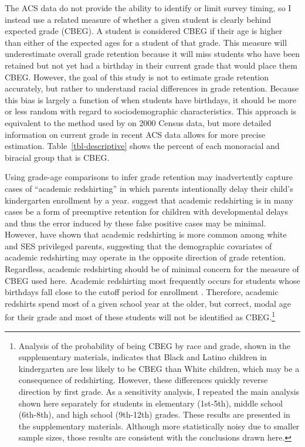 \documentclass[
  12pt,
  letterpaper,
]{article}
\begin{document}
The ACS data do not provide the ability to identify or limit survey
timing, so I instead use a related measure of whether a given student is
clearly behind expected grade (CBEG). A student is considered CBEG if
their age is higher than either of the expected ages for a student of
that grade. This measure will underestimate overall grade retention
because it will miss students who have been retained but not yet had a
birthday in their current grade that would place them CBEG. However, the
goal of this study is not to estimate grade retention accurately, but
rather to understand racial differences in grade retention. Because this
bias is largely a function of when students have birthdays, it should be
more or less random with regard to sociodemographic characteristics.
This approach is equivalent to the method used by
\textcite{rosenfeld_nontraditional_2010} on 2000 Census data, but more
detailed information on current grade in recent ACS data allows for more
precise estimation. Table~\ref{tbl-descriptive} shows the percent of
each monoracial and biracial group that is CBEG.

Using grade-age comparisons to infer grade retention may inadvertently
capture cases of ``academic redshirting'' in which parents intentionally
delay their child's kindergarten enrollment by a year.
\textcite{frederick_have_2008} suggest that academic redshirting is in
many cases be a form of preemptive retention for children with
developmental delays and thus the error induced by these false positive
cases may be minimal. However, \textcite{bassok_academic_2013} have
shown that academic redshirting is more common among white and SES
privileged parents, suggesting that the demographic covariates of
academic redshirting may operate in the opposite direction of grade
retention. Regardless, academic redshirting should be of minimal concern
for the measure of CBEG used here. Academic redshirting most frequently
occurs for students whose birthdays fall close to the cutoff period for
enrollment \autocite{graue_redshirting_2000,bassok_academic_2013}.
Therefore, academic redshirts spend most of a given school year at the
older, but correct, modal age for their grade and most of these students
will not be identified as CBEG.\footnote{Analysis of the probability of
  being CBEG by race and grade, shown in the supplementary materials,
  indicates that Black and Latino children in kindergarten are less
  likely to be CBEG than White children, which may be a consequence of
  redshirting. However, these differences quickly reverse direction by
  first grade. As a sensitivity analysis, I repeated the main analysis
  shown here separately for students in elementary (1st-5th), middle
  school (6th-8th), and high school (9th-12th) grades. These results are
  presented in the supplementary materials. Although more statistically
  noisy due to smaller sample sizes, those results are consistent with
  the conclusions drawn here.}
\end{document}
